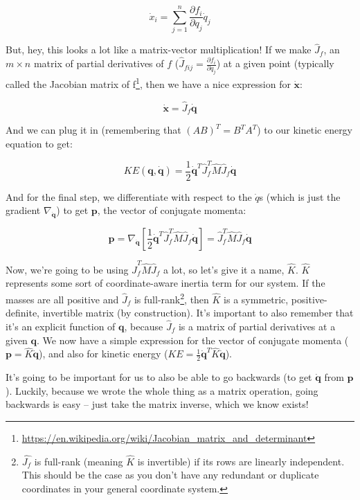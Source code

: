 \documentclass[]{article}
\renewcommand{\href}[2]{#2\footnote{\url{#1}}}
\begin{document}
\[
\dot{x}_i = \sum_{j = 1}^n \frac{\partial f_i}{\partial q_j} \dot{q}_j
\]

But, hey, this looks a lot like a matrix-vector multiplication! If we make
\(\hat{J}_f\), an \(m \times n\) matrix of partial derivatives of \(f\)
(\(\hat{J}_{fij} = \frac{\partial f_i}{\partial q_j}\)) at a given point
(typically called the
\href{https://en.wikipedia.org/wiki/Jacobian_matrix_and_determinant}{Jacobian
matrix of f}, then we have a nice expression for \(\dot{\mathbf{x}}\):

\[
\dot{\mathbf{x}} = \hat{J}_f \dot{\mathbf{q}}
\]

And we can plug it in (remembering that \((A B)^T = B^T A^T\)) to our kinetic
energy equation to get:

\[
KE(\mathbf{q},\dot{\mathbf{q}}) = \frac{1}{2} \dot{\mathbf{q}}^T \hat{J}_f^T
    \hat{M} \hat{J}_f \dot{\mathbf{q}}
\]

And for the final step, we differentiate with respect to the \(\dot{q}\)s (which
is just the gradient \(\nabla_{\dot{\mathbf{q}}}\)) to get \(\mathbf{p}\), the
vector of conjugate momenta:

\[
\mathbf{p} = \nabla_{\dot{\mathbf{q}}} \left[
    \frac{1}{2} \dot{\mathbf{q}}^T \hat{J}_f^T \hat{M} \hat{J}_f \dot{\mathbf{q}}
  \right]
  = \hat{J}_f^T \hat{M} \hat{J}_f \dot{\mathbf{q}}
\]

Now, we're going to be using \(\hat{J}_f^T \hat{M} \hat{J}_f\) a lot, so let's
give it a name, \(\hat{K}\). \(\hat{K}\) represents some sort of
coordinate-aware inertia term for our system. If the masses are all positive and
\(\hat{J}_f\) is full-rank\footnote{\(\hat{J_f}\) is full-rank (meaning
  \(\hat{K}\) is invertible) if its rows are linearly independent. This should
  be the case as you don't have any redundant or duplicate coordinates in your
  general coordinate system.}, then \(\hat{K}\) is a symmetric,
positive-definite, invertible matrix (by construction). It's important to also
remember that it's an explicit function of \(\mathbf{q}\), because \(\hat{J}_f\)
is a matrix of partial derivatives at a given \(\mathbf{q}\). We now have a
simple expression for the vector of conjugate momenta
(\(\mathbf{p} = \hat{K} \dot{\mathbf{q}}\)), and also for kinetic energy
(\(KE = \frac{1}{2} \dot{\mathbf{q}}^T \hat{K} \dot{\mathbf{q}}\)).

It's going to be important for us to also be able to go backwards (to get
\(\dot{\mathbf{q}}\) from \(\mathbf{p}\)). Luckily, because we wrote the whole
thing as a matrix operation, going backwards is easy -- just take the matrix
inverse, which we know exists!
\end{document}
